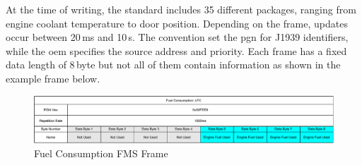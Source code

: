 At the time of writing, the standard includes 35 different packages, ranging from engine coolant temperature to door position.  Depending on the frame, updates occur between 20\,ms and 10\,s. The convention set the \acrfull{pgn} for J1939 identifiers, while the \acrshort{oem} specifies the source address and priority. Each frame has a fixed data length of 8\,byte but not all of them contain information as shown in the example frame below.\cite{fms-standard-description}

\begin{figure}[h!]
	\centering
	\hfuzz=11.0pt
	\includegraphics[width=\textwidth]{images/fms-frame}
	\caption{Fuel Consumption FMS Frame}
	\label{fig:fms-frame}
\end{figure}

